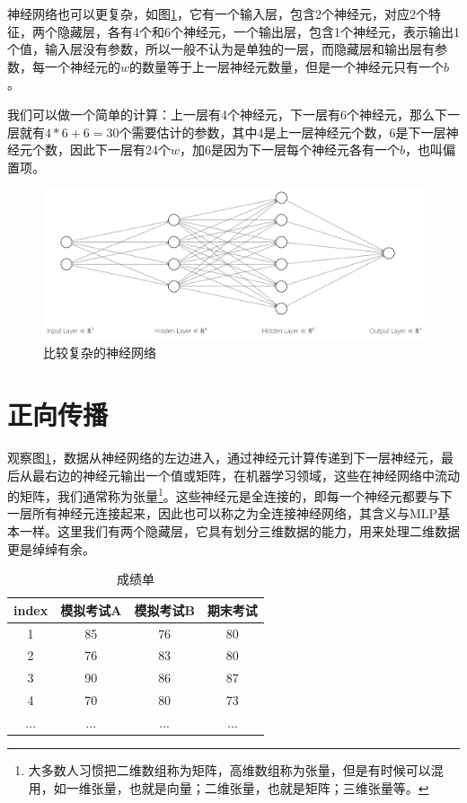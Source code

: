 \documentclass[a5paper, 11pt, openany]{book}
\begin{document}
神经网络也可以更复杂，如图\ref{figure4}，它有一个输入层，包含2个神经元，对应2个特征，两个隐藏层，各有4个和6个神经元，一个输出层，包含1个神经元，表示输出1个值，输入层没有参数，所以一般不认为是单独的一层，而隐藏层和输出层有参数，每一个神经元的$w$的数量等于上一层神经元数量，但是一个神经元只有一个$b$。

我们可以做一个简单的计算：上一层有4个神经元，下一层有6个神经元，那么下一层就有$4*6+6=30$个需要估计的参数，其中4是上一层神经元个数，6是下一层神经元个数，因此下一层有24个$w$，加6是因为下一层每个神经元各有一个$b$，也叫偏置项。

\begin{figure}[ht]
    \centering
    \includegraphics[width=\textwidth]{figures/复杂神经网络.png}
    \caption{比较复杂的神经网络}
    \label{figure4}
\end{figure}

\section{正向传播}

观察图\ref{figure4}，数据从神经网络的左边进入，通过神经元计算传递到下一层神经元，最后从最右边的神经元输出一个值或矩阵，在机器学习领域，这些在神经网络中流动的矩阵，我们通常称为张量\footnote{大多数人习惯把二维数组称为矩阵，高维数组称为张量，但是有时候可以混用，如一维张量，也就是向量；二维张量，也就是矩阵；三维张量等。}。这些神经元是全连接的，即每一个神经元都要与下一层所有神经元连接起来，因此也可以称之为全连接神经网络，其含义与MLP基本一样。这里我们有两个隐藏层，它具有划分三维数据的能力，用来处理二维数据更是绰绰有余。

\begin{table}[ht]
    \centering
    \begin{tabular}{c c c c}
      index & 模拟考试A & 模拟考试B & 期末考试  \\ \hline
         1  & 85     &   76     &  80      \\ 
         2  & 76     &   83     &  80      \\ 
         3  & 90     &   86     &  87      \\
         4  & 70     &   80     &  73      \\
         ...&  ...   &   ...    &  ...
    \end{tabular}
    \caption{成绩单}
    \label{table1}
\end{table}
\end{document}
